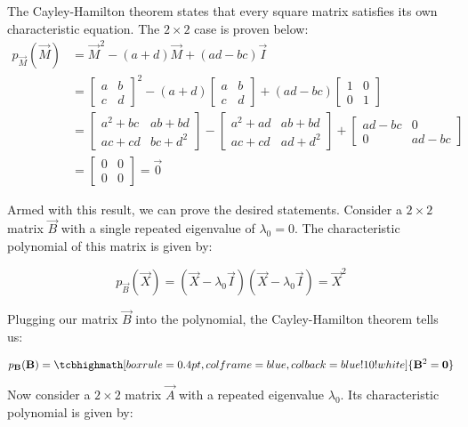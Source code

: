 \documentclass{article}
\begin{document}
The Cayley-Hamilton theorem states that every square matrix satisfies its own characteristic equation. The $2\times2$ case is proven below:
\begin{align*}
  p_{\vec M}(\vec M)&=\vec M^2-(a+d)\vec M+(ad-bc)\vec I\\
  &=\begin{bmatrix}
    a&b\\c&d
  \end{bmatrix}^2-(a+d)\begin{bmatrix}
    a&b\\c&d
  \end{bmatrix}+(ad-bc)\begin{bmatrix}
    1&0\\0&1
  \end{bmatrix}\\
  &=\begin{bmatrix}
    a^2+bc&ab+bd\\ac+cd&bc+d^2
  \end{bmatrix}-\begin{bmatrix}
    a^2+ad&ab+bd\\ac+cd&ad+d^2
  \end{bmatrix}+\begin{bmatrix}
    ad-bc&0\\0&ad-bc
  \end{bmatrix}\\
  &=\begin{bmatrix}
    0&0\\0&0
  \end{bmatrix}=\vec 0
\end{align*}

Armed with this result, we can prove the desired statements. Consider a $2\times2$ matrix $\vec B$ with a single repeated eigenvalue of $\lambda_0=0$. The characteristic polynomial of this matrix is given by:

\begin{equation*}
  p_{\vec B}(\vec X)=(\vec X-\lambda_0\vec I)(\vec X-\lambda_0\vec I)=\vec X^2
\end{equation*}
\smallskip

Plugging our matrix $\vec B$ into the polynomial, the Cayley-Hamilton theorem tells us:

\begin{equation*}
  p_{\vec B}(\vec B)=\tcbhighmath[boxrule=0.4pt,colframe=blue,colback=blue!10!white]{\vec B^2=\vec 0}
\end{equation*}
\smallskip

Now consider a $2\times2$ matrix $\vec A$ with a repeated eigenvalue $\lambda_0$. Its characteristic polynomial is given by:
\end{document}
